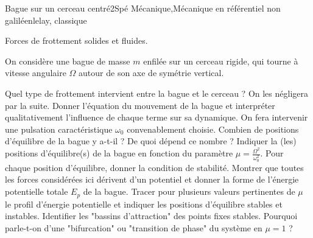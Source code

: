
\begin{exercise}{Bague sur un cerceau centré}{2}{Spé}
{Mécanique,Mécanique en référentiel non galiléen}{lelay, classique}

\begin{questions}
    \questioncours Forces de frottement solides et fluides.
\begin{EnvUplevel}
On considère une bague de masse $m$ enfilée sur un cerceau rigide, qui tourne à vitesse angulaire $\Omega$ autour de son axe de symétrie vertical.
\end{EnvUplevel}
    \question Quel type de frottement intervient entre la bague et le cerceau ? On les négligera par la suite.
    \question Donner l'équation du mouvement de la bague et interpréter qualitativement l'influence de chaque terme sur sa dynamique. On fera intervenir une pulsation caractéristique $\omega_0$ convenablement choisie.
    \question Combien de positions d'équilibre de la bague y a-t-il ? De quoi dépend ce nombre ?
    \question Indiquer la (les) positions d'équilibre(s) de la bague en fonction du paramètre $\mu = \frac{\Omega^2}{\omega_0^2}$. Pour chaque position d'équilibre, donner la condition de stabilité.
    \question Montrer que toutes les forces considérées ici dérivent d'un potentiel et donner la forme de l'énergie potentielle totale $E_p$ de la bague.
    \question Tracer pour plusieurs valeurs pertinentes de $\mu$ le profil d'énergie potentielle et indiquer les positions d'équilibre stables et instables. Identifier les "bassins d'attraction" des points fixes stables.
    \question Pourquoi parle-t-on d'une "bifurcation" ou "transition de phase" du système en $\mu = 1$ ? 
\end{questions}
\end{exercise}